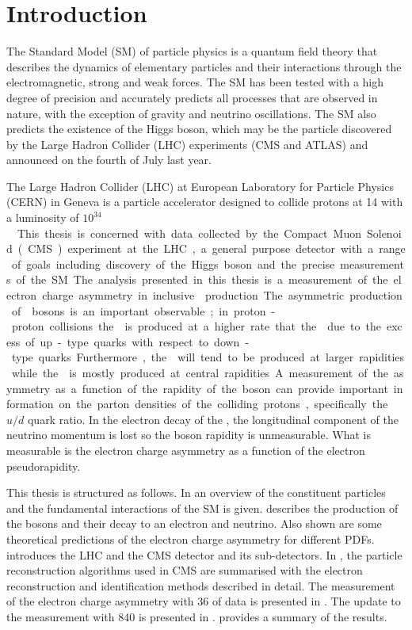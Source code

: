 \chapter{Introduction}
\label{chap:introduction}

The Standard Model (SM) of particle physics is a quantum field theory that
describes the dynamics of elementary particles and their interactions through
the electromagnetic, strong and weak forces. The {SM} has been tested with a
high degree of precision and accurately predicts all processes that are observed
in nature, with the exception of gravity and neutrino oscillations. The {SM}
also predicts the existence of the Higgs boson, which may be the particle
discovered by the Large Hadron Collider (LHC) experiments ({CMS} and {ATLAS}) and announced on the
fourth of July last year\cite{chatrchyan2012observation,aad2012observation}.

The Large Hadron Collider (LHC) at European Laboratory for Particle Physics
(CERN) in Geneva is a particle accelerator designed to collide protons at
\unit{14}{\TeV} with a luminosity of \unit{$10^{34}$}{\lumiunits}. This thesis
is concerned with data collected by the Compact Muon Solenoid (CMS) experiment at
the {LHC}, a general purpose detector with a range of goals including discovery
of the Higgs boson and the precise measurements of the {SM}.

The analysis presented in this thesis is a measurement of the electron charge
asymmetry in inclusive \PW production. The asymmetric production of \PW bosons
is an important observable; in proton-proton collisions the \PWp is  produced at
a higher rate that the \PWm due to the excess of up-type quarks with respect to
down-type quarks. Furthermore, the \PWp will tend to be produced at larger
rapidities while the \PWm is mostly produced at central rapidities. A
measurement of the asymmetry as a function of the rapidity of the boson can
provide important information on the parton densities of the colliding protons,
specifically the ${u}/{d}$ quark ratio.  In the electron decay of the
\PW, the longitudinal component of the neutrino momentum is lost so the boson
rapidity is unmeasurable. What is measurable is the electron charge asymmetry as
a function of the electron pseudorapidity. 

This thesis is structured as follows. In  an overview of the
constituent particles  and the fundamental interactions of the {SM} is given.
 describes the production of the \PW bosons and their
decay to an electron and neutrino. Also shown are some theoretical predictions
of the electron charge asymmetry for different PDFs.  
introduces the {LHC} and the {CMS} detector and its sub-detectors.  In
, the particle reconstruction algorithms used in CMS
are summarised with the electron reconstruction and identification methods
described in detail. The measurement of the electron charge asymmetry with
\unit{36}{\invpb} of data is presented in . The update
to the measurement with \unit{840}{\invpb} is presented in
.  provides a summary of
the results.




